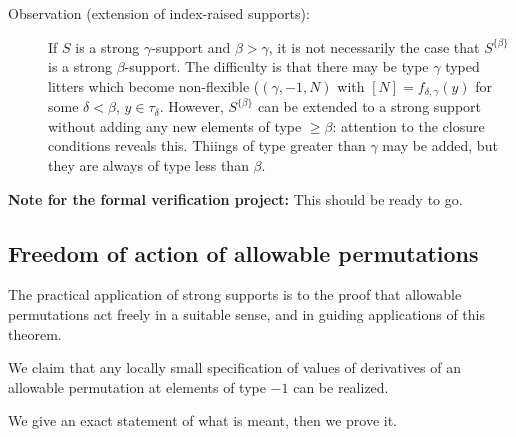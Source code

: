 \documentclass[112pt]{article}
\begin{document}
\begin{description}
\item[Observation (extension of index-raised supports):]  If $S$ is a strong $\gamma$-support and $\beta>\gamma$, it is not necessarily the case
that $S^{\{\beta\}}$ is a strong $\beta$-support.  The difficulty is that there may be type $\gamma$ typed litters which become non-flexible ($(\gamma,-1,N)$ with $[N] = f_{\delta,\gamma}(y)$ for some $\delta<\beta$, $y \in \tau_\delta$.  However, $S^{\{\beta\}}$ can be extended to a strong support without adding any new elements of type $\geq \beta$:  attention to the closure conditions reveals this.  Thiings of type greater than $\gamma$ may be added, but they are always of type less than $\beta$.

\end{description}

{\bf Note for the formal verification project:}  This should be ready to go.
\newpage
\subsection{Freedom of action of allowable permutations}

The practical application of strong supports is to the proof that allowable permutations act freely in a suitable sense, and in guiding applications of this theorem.

We claim that any locally small specification of values of derivatives of an allowable permutation at elements of type $-1$ can be realized.

We give an exact statement of what is meant, then we prove it.
\end{document}
